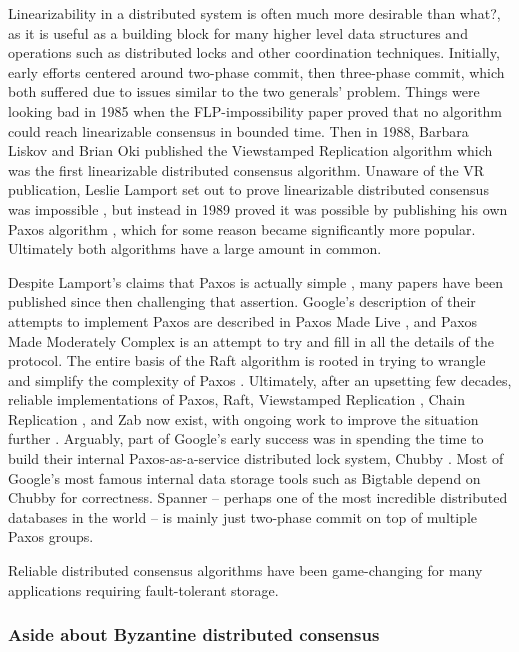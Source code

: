 \documentclass[a4paper,10pt]{article} \usepackage[utf8]{inputenc}
\newcommand{\bs}[1]{{\color{red}#1}}
\begin{document}
Linearizability in a distributed system is often much more desirable 
\bs{than what?}, as it is
useful as a building block for many higher level data structures and operations
such as distributed locks and other coordination techniques. Initially, early
efforts centered around two-phase commit, then three-phase commit, which both
suffered due to issues similar to the two generals' problem. Things were looking
bad in 1985 when the FLP-impossibility paper \cite{flp} proved that no algorithm
could reach linearizable consensus in bounded time. Then in 1988, Barbara Liskov
and Brian Oki published the Viewstamped Replication algorithm \cite{vr} which
was the first linearizable distributed consensus algorithm. Unaware of the VR
publication, Leslie Lamport set out to prove linearizable distributed consensus
was impossible \cite{paxos-note}, but instead in 1989 proved it was possible by
publishing his own Paxos algorithm \cite{paxos}, which for some reason became
significantly more popular. Ultimately both algorithms have a large amount in
common.

Despite Lamport's claims that Paxos is actually simple \cite{paxos-simple},
many papers have been published since then
challenging that assertion. Google's description of their attempts to implement
Paxos are described in Paxos Made Live \cite{paxos-live}, 
and Paxos Made Moderately
Complex \cite{paxos-complex} is an attempt to try and fill in all the details of
the protocol. The entire basis of the Raft algorithm is rooted in trying to
wrangle and simplify the complexity of Paxos \cite{raft}. Ultimately, after an
upsetting few decades, reliable implementations of Paxos, Raft, Viewstamped
Replication \cite{vrr}, Chain Replication \cite{chain-rep}, and Zab \cite{zab}
now exist, with ongoing work to improve the situation
further \cite{epaxos,paxos-flexible}. Arguably, part of Google's early success
was in spending the time to build their internal Paxos-as-a-service distributed
lock system, Chubby \cite{chubby}. Most of Google's most famous internal data
storage tools such as Bigtable \cite{bigtable} depend on Chubby for
correctness. Spanner \cite{spanner} -- perhaps one of the most incredible
distributed databases in the world -- is mainly just two-phase commit on top of
multiple Paxos groups.

Reliable distributed consensus algorithms have been game-changing for many
applications requiring fault-tolerant storage.

\subsubsection{Aside about Byzantine distributed consensus}
\end{document}
